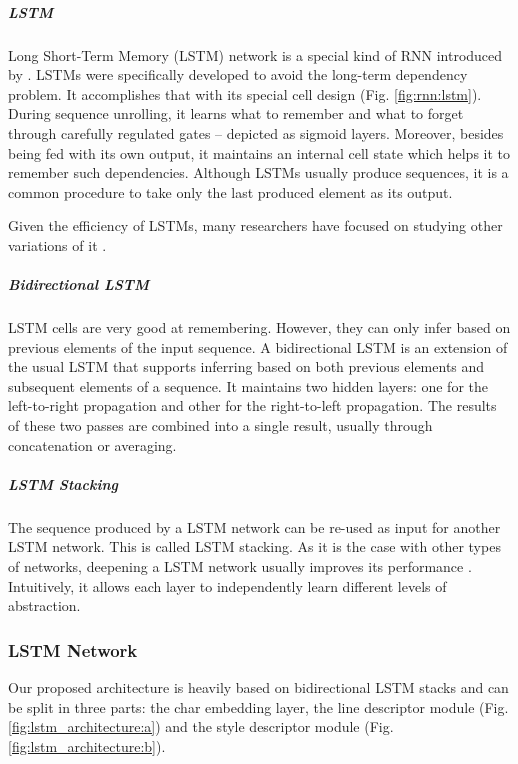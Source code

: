 \subparagraph*{LSTM} 
Long Short-Term Memory (LSTM) network is a special kind of RNN introduced by . LSTMs were specifically developed to avoid the long-term dependency problem. It accomplishes that with its special cell design (Fig. \ref{fig:rnn:lstm}). During sequence unrolling, it learns what to remember and what to forget through carefully regulated gates -- depicted as sigmoid layers. Moreover, besides being fed with its own output, it maintains an internal cell state which helps it to remember such dependencies. Although LSTMs usually produce sequences, it is a common procedure to take only the last produced element as its output.

Given the efficiency of LSTMs, many researchers have focused on studying other variations of it \cite{lstm_odyssey}.

\subparagraph*{Bidirectional LSTM} LSTM cells are very good at remembering. However, they can only infer based on previous elements of the input sequence. A bidirectional LSTM \cite{bi_lstm} is an extension of the usual LSTM that supports inferring based on both previous elements and subsequent elements of a sequence. It maintains two hidden layers: one for the left-to-right propagation and other for the right-to-left propagation. The results of these two passes are combined into a single result, usually through concatenation or averaging.

\subparagraph*{LSTM Stacking} The sequence produced by a LSTM network can be re-used as input for another LSTM network. This is called LSTM stacking. As it is the case with other types of networks, deepening a LSTM network usually improves its performance \cite{deep_lstm}. Intuitively, it allows each layer to independently learn different levels of abstraction.

\subsubsection{LSTM Network}\label{sec:models:lstm}

Our proposed architecture is heavily based on bidirectional LSTM stacks and can be split in three parts: the char embedding layer, the line descriptor module (Fig. \ref{fig:lstm_architecture:a}) and the style descriptor module (Fig. \ref{fig:lstm_architecture:b}).

